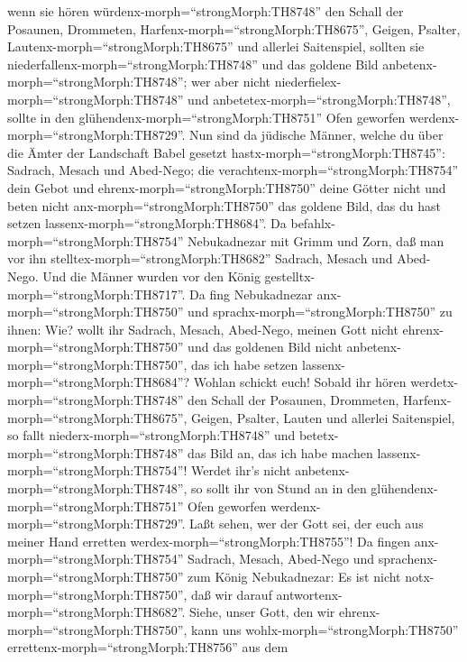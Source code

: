 wenn sie hören würdenx-morph=``strongMorph:TH8748'' den Schall der
Posaunen, Drommeten, Harfenx-morph=``strongMorph:TH8675'', Geigen,
Psalter, Lautenx-morph=``strongMorph:TH8675'' und allerlei Saitenspiel,
sollten sie niederfallenx-morph=``strongMorph:TH8748'' und das goldene
Bild anbetenx-morph=``strongMorph:TH8748'';  wer aber nicht
niederfielex-morph=``strongMorph:TH8748'' und
anbetetex-morph=``strongMorph:TH8748'', sollte in den
glühendenx-morph=``strongMorph:TH8751'' Ofen geworfen
werdenx-morph=``strongMorph:TH8729''.  Nun sind da jüdische
Männer, welche du über die Ämter der Landschaft Babel gesetzt
hastx-morph=``strongMorph:TH8745'': Sadrach, Mesach und Abed-Nego; die
verachtenx-morph=``strongMorph:TH8754'' dein Gebot und
ehrenx-morph=``strongMorph:TH8750'' deine Götter nicht und beten nicht
anx-morph=``strongMorph:TH8750'' das goldene Bild, das du hast setzen
lassenx-morph=``strongMorph:TH8684''.  Da
befahlx-morph=``strongMorph:TH8754'' Nebukadnezar mit Grimm und Zorn,
daß man vor ihn stelltex-morph=``strongMorph:TH8682'' Sadrach, Mesach
und Abed-Nego. Und die Männer wurden vor den König
gestelltx-morph=``strongMorph:TH8717''.  Da fing
Nebukadnezar anx-morph=``strongMorph:TH8750'' und
sprachx-morph=``strongMorph:TH8750'' zu ihnen: Wie? wollt ihr Sadrach,
Mesach, Abed-Nego, meinen Gott nicht ehrenx-morph=``strongMorph:TH8750''
und das goldenen Bild nicht anbetenx-morph=``strongMorph:TH8750'', das
ich habe setzen lassenx-morph=``strongMorph:TH8684''? 
Wohlan schickt euch! Sobald ihr hören
werdetx-morph=``strongMorph:TH8748'' den Schall der Posaunen, Drommeten,
Harfenx-morph=``strongMorph:TH8675'', Geigen, Psalter, Lauten und
allerlei Saitenspiel, so fallt niederx-morph=``strongMorph:TH8748'' und
betetx-morph=``strongMorph:TH8748'' das Bild an, das ich habe machen
lassenx-morph=``strongMorph:TH8754''! Werdet ihr's nicht
anbetenx-morph=``strongMorph:TH8748'', so sollt ihr von Stund an in den
glühendenx-morph=``strongMorph:TH8751'' Ofen geworfen
werdenx-morph=``strongMorph:TH8729''. Laßt sehen, wer der Gott sei, der
euch aus meiner Hand erretten werdex-morph=``strongMorph:TH8755''!
 Da fingen anx-morph=``strongMorph:TH8754'' Sadrach,
Mesach, Abed-Nego und sprachenx-morph=``strongMorph:TH8750'' zum König
Nebukadnezar: Es ist nicht notx-morph=``strongMorph:TH8750'', daß wir
darauf antwortenx-morph=``strongMorph:TH8682''.  Siehe,
unser Gott, den wir ehrenx-morph=``strongMorph:TH8750'', kann uns
wohlx-morph=``strongMorph:TH8750''
errettenx-morph=``strongMorph:TH8756'' aus dem
